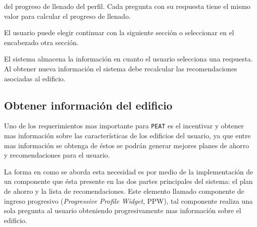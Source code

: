 \begin{usecase}
{\begin{enumerate}
      del progreso de llenado del perfil. Cada pregunta con su respuesta tiene el
      mismo valor para calcular el progreso de llenado.
    \end{enumerate}
  \item El usuario puede elegir continuar con la siguiente sección o seleccionar
    en el encabezado otra sección.
  \item El sistema almacena la información en cuanto el usuario selecciona
    una respuesta. Al obtener nueva información el sistema debe recalcular
    las recomendaciones asociadas al edificio.
  }
\end{usecase}

\subsection{Obtener información del edificio}

Uno de los requerimientos mas importante para \texttt{PEAT} es el incentivar y
obtener mas información sobre las características de los edificios del usuario,
ya que entre mas información se obtenga de éstos se podrán generar mejores planes
de ahorro y recomendaciones para el usuario.

La forma en como se aborda esta necesidad es por medio de la implementación
de un componente que ésta presente en las dos partes principales del sistema:
el plan de ahorro y la lista de recomendaciones. Este elemento llamado
componente de ingreso progresivo (\textit{Progressive Profile Widget}, PPW),
tal componente realiza una sola pregunta al usuario obteniendo progresivamente
mas información sobre el edificio.


